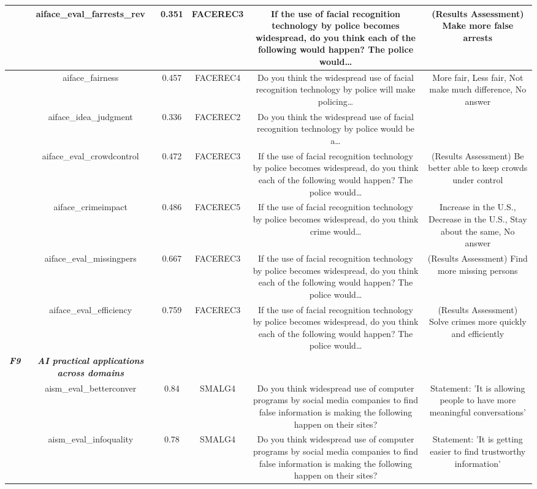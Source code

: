 {\begin{tabular}{c | c | c | c | c | c}
  \hline
   & aiface\_eval\_farrests\_rev & 0.351 & FACEREC3 & If the use of facial recognition technology by police becomes widespread, do you think each of the following would happen? The police would… & (Results Assessment) Make more false arrests \\
  \hline
   & aiface\_fairness & 0.457 & FACEREC4 & Do you think the widespread use of facial recognition technology by police will make policing… & More fair, Less fair, Not make much difference, No answer \\
  \hline
   & aiface\_idea\_judgment & 0.336 & FACEREC2 & Do you think the widespread use of facial recognition technology by police would be a… &  \\
  \hline
   & aiface\_eval\_crowdcontrol & 0.472 & FACEREC3 & If the use of facial recognition technology by police becomes widespread, do you think each of the following would happen? The police would… & (Results Assessment) Be better able to keep crowds under control \\
  \hline
   & aiface\_crimeimpact & 0.486 & FACEREC5 & If the use of facial recognition technology by police becomes widespread, do you think crime would… & Increase in the U.S., Decrease in the U.S., Stay about the same, No answer \\
  \hline
   & aiface\_eval\_missingpers & 0.667 & FACEREC3 & If the use of facial recognition technology by police becomes widespread, do you think each of the following would happen? The police would… & (Results Assessment) Find more missing persons \\
  \hline
  \textit{ } & aiface\_eval\_efficiency & 0.759 & FACEREC3 & If the use of facial recognition technology by police becomes widespread, do you think each of the following would happen? The police would… & (Results Assessment) Solve crimes more quickly and efficiently \\
  \hline
  \textit{\textbf{F9}} & \textit{\textbf{AI practical applications across domains}} \\
  \hline
   & aism\_eval\_betterconver & 0.84 & SMALG4 & Do you think widespread use of computer programs by social media companies to find false information is making the following happen on their sites? & Statement: 'It is allowing people to have more meaningful conversations' \\
  \hline
  \textit{ } & aism\_eval\_infoquality & 0.78 & SMALG4 & Do you think widespread use of computer programs by social media companies to find false information is making the following happen on their sites? & Statement: 'It is getting easier to find trustworthy information' \\

\end{tabular}}
